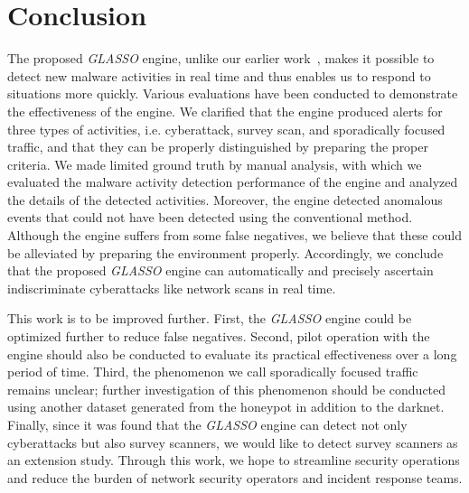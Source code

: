 \documentclass[conference]{IEEEtran}
\begin{document}



\section{Conclusion}
The proposed {\it GLASSO} engine, unlike our earlier work~\cite{Han}, makes it possible to detect new malware activities in real time and thus enables us to respond to situations more quickly.
Various evaluations have been conducted to demonstrate the effectiveness of the engine.
We clarified that the engine produced alerts for three types of activities, i.e. cyberattack, survey scan, and sporadically focused traffic, and that they can be properly distinguished by preparing the proper criteria.
We made limited ground truth by manual analysis, with which we evaluated the malware activity detection performance of the engine and analyzed the details of the detected activities.
Moreover, the engine detected anomalous events that could not have been detected using the conventional method.
Although the engine suffers from some false negatives, we believe that these could be alleviated by preparing the environment properly.
Accordingly, we conclude that the proposed {\it GLASSO} engine can automatically and precisely ascertain indiscriminate cyberattacks like network scans in real time.

This work is to be improved further.
First, the {\it GLASSO} engine could be optimized further to reduce false negatives.
Second, pilot operation with the engine should also be conducted to evaluate its practical effectiveness over a long period of time.
Third, the phenomenon we call sporadically focused traffic remains unclear; further investigation of this phenomenon should be conducted using another dataset generated from the honeypot in addition to the darknet.
Finally, since it was found that the {\it GLASSO} engine can detect not only cyberattacks but also survey scanners, we would like to detect survey scanners as an extension study.
Through this work, we hope to streamline security operations and reduce the burden of network security operators and incident response teams.
\end{document}
